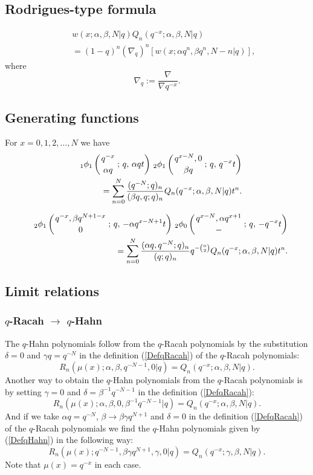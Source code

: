\documentclass[envcountchap,graybox]{svmono}
\newcounter{rom}
\newcommand{\qhyp}[5]{\mbox{}_{#1}{\phi}_{#2}
\left(\genfrac{}{}{0pt}{}{#3}{#4}\,;\,q,\,#5\right)}
\newcommand{\qhyp}[5]{\,\mbox{}_{#1}\phi_{#2}\!\left(
  \genfrac{}{}{0pt}{}{#3}{#4};#5\right)}
\begin{document}
\subsection*{Rodrigues-type formula}
\begin{eqnarray}
\label{RodqHahn}
& &w(x;\alpha,\beta,N|q)Q_n(q^{-x};\alpha,\beta,N|q)\nonumber\\
& &{}=(1-q)^n\left(\nabla_q\right)^n\left[w(x;\alpha q^n,\beta q^n,N-n|q)\right],
\end{eqnarray}
where
$$\nabla_q:=\frac{\nabla}{\nabla q^{-x}}.$$

\subsection*{Generating functions} For $x=0,1,2,\ldots,N$ we have
\begin{eqnarray}
\label{GenqHahn1}
& &\qhyp{1}{1}{q^{-x}}{\alpha q}{\alpha qt}\,\qhyp{2}{1}{q^{x-N},0}{\beta q}{q^{-x}t}\nonumber\\
& &{}=\sum_{n=0}^N\frac{(q^{-N};q)_n}{(\beta q,q;q)_n}Q_n(q^{-x};\alpha,\beta,N|q)t^n.
\end{eqnarray}

\begin{eqnarray}
\label{GenqHahn2}
& &\qhyp{2}{1}{q^{-x},\beta q^{N+1-x}}{0}{-\alpha q^{x-N+1}t}\,
\qhyp{2}{0}{q^{x-N},\alpha q^{x+1}}{-}{-q^{-x}t}\nonumber\\
& &{}=\sum_{n=0}^N\frac{(\alpha q,q^{-N};q)_n}{(q;q)_n}q^{-\binom{n}{2}}Q_n(q^{-x};\alpha,\beta,N|q)t^n.
\end{eqnarray}

\subsection*{Limit relations}

\subsubsection*{$q$-Racah $\rightarrow$ $q$-Hahn}
The $q$-Hahn polynomials follow from the $q$-Racah polynomials by the substitution
$\delta=0$ and $\gamma q=q^{-N}$ in the definition (\ref{DefqRacah}) of the
$q$-Racah polynomials:
$$R_n(\mu(x);\alpha,\beta,q^{-N-1},0|q)=Q_n(q^{-x};\alpha,\beta,N|q).$$
Another way to obtain the $q$-Hahn polynomials from the $q$-Racah
polynomials is by setting $\gamma=0$ and $\delta=\beta^{-1}q^{-N-1}$ in the definition
(\ref{DefqRacah}):
$$R_n(\mu(x);\alpha,\beta,0,\beta^{-1}q^{-N-1}|q)=Q_n(q^{-x};\alpha,\beta,N|q).$$
And if we take $\alpha q=q^{-N}$, $\beta\rightarrow\beta\gamma q^{N+1}$ and $\delta=0$ in the
definition (\ref{DefqRacah}) of the $q$-Racah polynomials we find the
$q$-Hahn polynomials given by (\ref{DefqHahn}) in the following way:
$$R_n(\mu(x);q^{-N-1},\beta\gamma q^{N+1},\gamma,0|q)=Q_n(q^{-x};\gamma,\beta,N|q).$$
Note that $\mu(x)=q^{-x}$ in each case.
\end{document}
